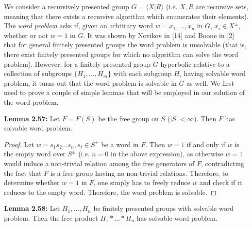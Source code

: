 \documentclass[12pt]{article}
\newcommand{\vs}{\vskip10pt}
\begin{document}
	\vs 
	
	We consider a recursively presented group $G = \langle X \vert R \rangle$ (i.e. $X,R$ are recursive sets, meaning that there exists a recursive algorithm which enumerates their elements). The \textit{word problem} asks if, given an arbitrary word $w = x_1,...,x_n$ in $G$, $x_i \in X^{\pm}$, whether or not $w = 1$ in $G$. It was shown by Novikov in [14] and Boone in [2] that for general finitely presented groups the word problem is unsolvable (that is, there exist finitely presented groups for which no algorithm can solve the word problem). However, for a finitely presented group $G$ hyperbolic relative to a collection of subgroups $\{H_1,...,H_m\}$ with each subgroup $H_i$ having solvable word problem, it turns out that the word problem is solvable in $G$ as well. We first need to prove a couple of simple lemmas that will be employed in our solution of the word problem. 
	
	\vs 
	
	\textbf{Lemma 2.57: } Let $F = F(S)$ be the free group on $S$ ($\vert S \vert < \infty$). Then $F$ has solvable word problem. 
	
	\begin{proof}
		
		Let $w = s_1 s_2 ... s_n, s_i \in S^{\pm}$ be a word in $F$. Then $w = 1$ if and only if $w$ is the empty word over $S^{\pm}$ (i.e. $n = 0$ in the above expression), as otherwise $w=1$ would induce a non-trivial relation among the free generators of $F$, contradicting the fact that $F$ is a free group having no non-trivial relations. Therefore, to determine whether $w=1$ in $F$, one simply has to freely reduce $w$ and check if it reduces to the empty word. Therefore, the word problem is solvable. 
		
	\end{proof}
	
	\vs 
	
	\textbf{Lemma 2.58: } Let $H_1,...,H_n$ be finitely presented groups with solvable word problem. Then the free product $H_1 * ... * H_n$ has solvable word problem. 
	
\end{document}
